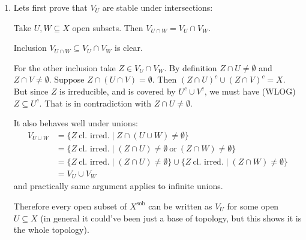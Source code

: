 \begin{exercise}{4}
    \begin{enumerate}
        \item{
                Lets first prove that $V_{U}$ are stable under
                intersections:
                \begin{claim}
                    Take $U, W \subseteq X$ open subsets. Then $V_{U \cap W} =
                    V_U \cap V_W$.
                \end{claim}
                \begin{proof_claim}
                    Inclusion $V_{U \cap W} \subseteq V_U \cap
                    V_W$ is clear.

                    For the other inclusion take $Z \in V_U \cap V_W$. By
                    definition $Z \cap U \not= \emptyset$ and $Z \cap V \not=
                    \emptyset$. Suppose $Z \cap (U \cap V) = \emptyset$. Then
                    $(Z \cap U)^c \cup (Z \cap V)^c = X$. But since $Z$ is
                    irreducible, and is covered by $U^c \cup V^c$, we must have
                    (WLOG) $Z \subseteq U^c$. That is in contradiction with
                    $Z \cap U \not= \emptyset$. 
                \end{proof_claim}

                It also behaves well under unions:
                \begin{align*}
                    V_{U \cup W} &= \{ Z\ \text{cl. irred.} \mid Z \cap (U \cup
                    W) \not= \emptyset \} \\
                    &= \{ Z\ \text{cl. irred.} \mid (Z \cap U) \not= \emptyset
                    \ \text{or}\ (Z \cap W) \not= \emptyset \} \\
                    &= \{ Z\ \text{cl. irred.} \mid (Z \cap U) \not= \emptyset
                    \} \cup \{ Z\ \text{cl. irred.} \mid (Z \cap W) \not=
                    \emptyset \} \\
                    &= V_U \cup V_W
                \end{align*}
                and practically same argument applies to infinite unions.

                Therefore every open subset of $X^{\text{sob}}$ can be written
                as $V_U$ for some open $U \subseteq X$ (in general it could've
                been just a base of topology, but this shows it is the whole
                topology).

}
\end{enumerate}
\end{exercise}
